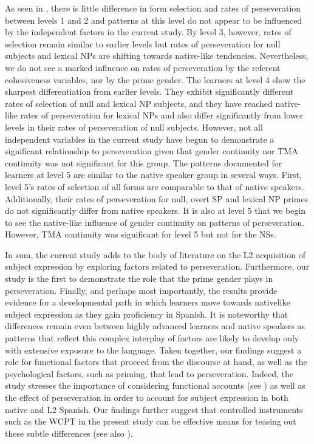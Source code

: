 \documentclass[output=paper]{langscibook}
\begin{document}
As seen in , there is little difference in form selection and rates of perseveration between levels 1 and 2 and patterns at this level do not appear to be influenced by the independent factors in the current study. By level 3, however, rates of selection remain similar to earlier levels but rates of perseveration for null subjects and lexical NPs are shifting towards native-like tendencies. Nevertheless, we do not see a marked influence on rates of perseveration by the referent cohesiveness variables, nor by the prime gender. The learners at level 4 show the sharpest differentiation from earlier levels. They exhibit significantly different rates of selection of null and lexical NP subjects, and they have reached native-like rates of perseveration for lexical NPs and also differ significantly from lower levels in their rates of perseveration of null subjects. However, not all independent variables in the current study have begun to demonstrate a significant relationship to perseveration given that gender continuity nor TMA continuity was not significant for this group. The patterns documented for learners at level 5 are similar to the native speaker group in several ways. First, level 5’s rates of selection of all forms are comparable to that of native speakers. Additionally, their rates of perseveration for null, overt SP and lexical NP primes do not significantly differ from native speakers. It is also at level 5 that we begin to see the native-like influence of gender continuity on patterns of perseveration.  However, TMA continuity was significant for level 5 but not for the NSs. 


In sum, the current study adds to the body of literature on the L2 acquisition of subject expression by exploring factors related to perseveration.  Furthermore, our study is the first to demonstrate the role that the prime gender plays in perseveration. Finally, and perhaps most importantly, the results provide evidence for a developmental path in which learners move towards nativelike subject expression as they gain proficiency in Spanish. It is noteworthy that differences remain even between highly advanced learners and native speakers as patterns that reflect this complex interplay of factors are likely to develop only with extensive exposure to the language. Taken together, our findings suggest a role for functional factors that proceed from the discourse at hand, as well as the psychological factors, such as priming, that lead to perseveration. Indeed, the study stresses the importance of considering functional accounts (see \citealt{Otheguy2015}) as well as the effect of perseveration in order to account for subject expression in both native and L2 Spanish. Our findings further suggest that controlled instruments such as the WCPT in the present study can be effective means for teasing out these subtle differences (see also \citealt{GeeslinLinfordFafulas2015}).
\end{document}
